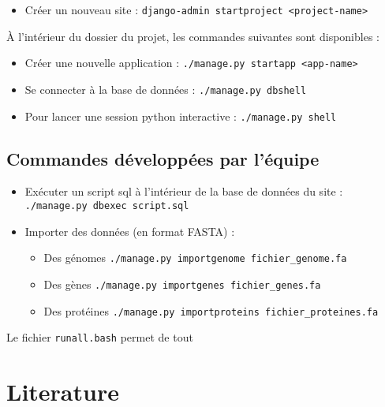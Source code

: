 \documentclass[
  openany]{book}
\providecommand{\tightlist}{%
  \setlength{\itemsep}{0pt}\setlength{\parskip}{0pt}}
\begin{document}
\begin{itemize}
\tightlist
\item
  Créer un nouveau site : \texttt{django-admin\ startproject\ \textless{}project-name\textgreater{}}
\end{itemize}

À l'intérieur du dossier du projet, les commandes suivantes sont disponibles :

\begin{itemize}
\tightlist
\item
  Créer une nouvelle application : \texttt{./manage.py\ startapp\ \textless{}app-name\textgreater{}}
\item
  Se connecter à la base de données : \texttt{./manage.py\ dbshell}
\item
  Pour lancer une session python interactive : \texttt{./manage.py\ shell}
\end{itemize}

\hypertarget{commandes-duxe9veloppuxe9es-par-luxe9quipe}{%
\section{Commandes développées par l'équipe}\label{commandes-duxe9veloppuxe9es-par-luxe9quipe}}

\begin{itemize}
\tightlist
\item
  Exécuter un script sql à l'intérieur de la base de données du site :
  \texttt{./manage.py\ dbexec\ script.sql}
\item
  Importer des données (en format FASTA) :

  \begin{itemize}
  \tightlist
  \item
    Des génomes \texttt{./manage.py\ importgenome\ fichier\_genome.fa}
  \item
    Des gènes \texttt{./manage.py\ importgenes\ fichier\_genes.fa}
  \item
    Des protéines \texttt{./manage.py\ importproteins\ fichier\_proteines.fa}
  \end{itemize}
\end{itemize}

Le fichier \texttt{runall.bash} permet de tout

\hypertarget{literature}{%
\chapter{Literature}\label{literature}}
\end{document}

